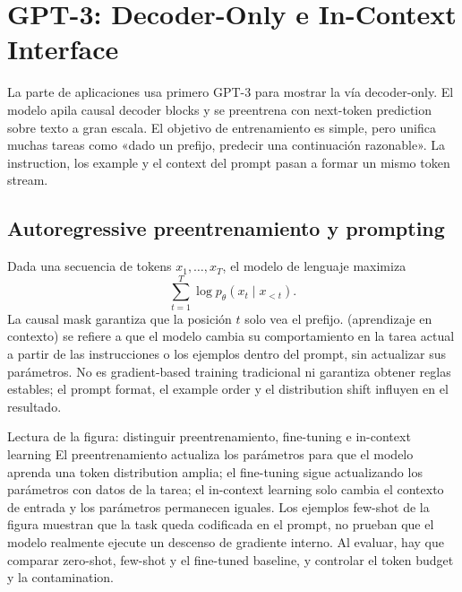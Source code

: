 \section{GPT-3: Decoder-Only e In-Context Interface}

La parte de aplicaciones usa primero GPT-3 para mostrar la vía decoder-only. El modelo apila causal decoder blocks y se preentrena con next-token prediction sobre texto a gran escala. El objetivo de entrenamiento es simple, pero unifica muchas tareas como «dado un prefijo, predecir una continuación razonable». La instruction, los example y el context del prompt pasan a formar un mismo token stream.

\subsection{Autoregressive preentrenamiento y prompting}

Dada una secuencia de tokens $x_1,\ldots,x_T$, el modelo de lenguaje maximiza
\[
\sum_{t=1}^{T}\log p_\theta(x_t\mid x_{<t}).
\]
La causal mask garantiza que la posición $t$ solo vea el prefijo.  (aprendizaje en contexto) se refiere a que el modelo cambia su comportamiento en la tarea actual a partir de las instrucciones o los ejemplos dentro del prompt, sin actualizar sus parámetros. No es gradient-based training tradicional ni garantiza obtener reglas estables; el prompt format, el example order y el distribution shift influyen en el resultado.


\begin{knowledgebox}{Lectura de la figura: distinguir preentrenamiento, fine-tuning e in-context learning}
El preentrenamiento actualiza los parámetros para que el modelo aprenda una token distribution amplia; el fine-tuning sigue actualizando los parámetros con datos de la tarea; el in-context learning solo cambia el contexto de entrada y los parámetros permanecen iguales. Los ejemplos few-shot de la figura muestran que la task queda codificada en el prompt, no prueban que el modelo realmente ejecute un descenso de gradiente interno. Al evaluar, hay que comparar zero-shot, few-shot y el fine-tuned baseline, y controlar el token budget y la contamination.
\end{knowledgebox}

